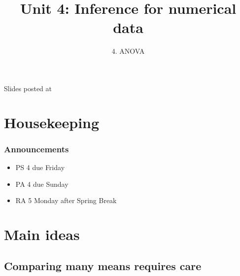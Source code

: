 \documentclass[slidestop,compress,mathserif,12pt,t,professionalfonts,xcolor=table]{beamer}
\title{Unit 4: Inference for numerical data}
\subtitle{4. ANOVA}
\author{\CourseName}
\date{}
\institute{\InstituteName}
\begin{document}



\begin{frame}[plain]

\titlepage

\vfill

{\scriptsize {} \hfill Slides posted at  \webURL{\CourseSite}}

\addtocounter{framenumber}{-1} 

\end{frame}


\section{Housekeeping}


\begin{frame}
\frametitle{Announcements}

\begin{itemize}

\item PS 4 due Friday

\item PA 4 due Sunday

\item RA 5 Monday after Spring Break

\end{itemize}

\end{frame}


\section{Main ideas}


\subsection{Comparing many means requires care}
\label{mi1}

\end{document}

